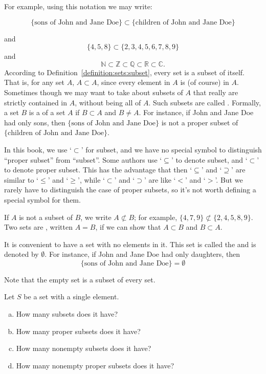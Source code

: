 For example, using this notation we may write:

\begin{equation*}
\{\text{sons of John and Jane Doe}\} \subset \{\text{children of John and Jane Doe\}}
\end{equation*}

and 
\[
\{4,5,8\} \subset \{2, 3, 4, 5, 6, 7, 8, 9 \}
\]
and
\[
{\mathbb N} \subset {\mathbb Z} \subset {\mathbb Q} \subset {\mathbb R} \subset {\mathbb C}.
\]
According to Definition~\ref{definition:sets:subset}, every set is a subset of itself.  That is, for any set $A$, $A \subset A$, since every element in $A$ is (of course) in $A$.  Sometimes though we may want to take about subsets of $A$ that really are strictly contained in $A$, without being all of $A$. Such subsets are called . Formally, a set $B$ is a  of a set $A$ if $B \subset A$ and $B \neq A$. For instance, if John and Jane Doe had only sons, then
$\{\textrm{sons of John and Jane Doe}\}$ is not a proper subset of $\{\textrm{children of John and Jane Doe}\}$.

\begin{rem} 
In this book, we use `$\subset$' for subset, and we have no special symbol to distinguish ``proper subset'' from ``subset''.
Some authors use  `$\subseteq$' to denote  subset, and  `$\subset$' to denote proper subset. This has the advantage that then `$\subseteq$' and `$\supseteq$' are similar to `$\le$' and `$\ge$', while `$\subset$' and `$\supset$' are like `$<$' and `$>$'.
But we rarely have to distinguish the case of proper subsets, so it's not worth defining a special symbol for them.
\end{rem}

If $A$ is not a subset of $B$, we write $A \not \subset B$; for example, $\{4, 7, 9\} \not \subset \{2, 4, 5,  8, 9 \}$.  Two sets are , written $A = B$, if we can show that $A \subset B$ and $B \subset A$.  

It is convenient to have a set with no elements in it.  This set is called the  and is denoted by $\emptyset$\label{theemptyset}.  For instance, if John and Jane Doe had only daughters, then
\[
\mbox{\{sons of John and Jane Doe\}} = \emptyset
\]

Note that the empty set is a subset of every set.  

\begin{exercise}{}
Let $S$ be a set with a single element.
\begin{enumerate}[(a)]
\item
How many subsets does it have?
\item
How many proper subsets does it have?
\item
How many nonempty subsets does it have?
\item
How many nonempty proper subsets does it have?
\end{enumerate}
\end{exercise}


